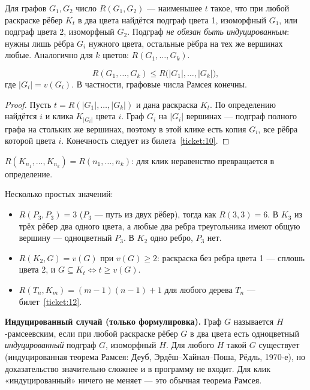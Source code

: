 \begin{definition}
Для графов \(G_1,G_2\) число \(R(G_1,G_2)\) — наименьшее \(t\) такое, что при любой
раскраске рёбер \(K_t\) в два цвета найдётся подграф цвета 1, изоморфный \(G_1\),
или подграф цвета 2, изоморфный \(G_2\). Подграф \emph{не обязан быть индуцированным}:
нужны лишь рёбра \(G_i\) нужного цвета, остальные рёбра на тех же вершинах любые.
Аналогично для \(k\) цветов: \(R(G_1,\ldots,G_k)\).
\end{definition}
\begin{theorem}[Существование]
\[
R(G_1,\ldots,G_k)\le R\bigl(|G_1|,\ldots,|G_k|\bigr),
\]
где \(|G_i|=v(G_i)\). В частности, графовые числа Рамсея конечны.
\end{theorem}
\begin{proof}
Пусть \(t=R(|G_1|,\ldots,|G_k|)\) и дана раскраска \(K_t\). По определению найдётся \(i\) и
клика \(K_{|G_i|}\) цвета \(i\). Граф \(G_i\) на \(|G_i|\) вершинах — подграф полного графа
на стольких же вершинах, поэтому в этой клике есть копия \(G_i\), все рёбра которой
цвета \(i\). Конечность следует из билета~\ref{ticket:10}.
\end{proof}
\begin{cor}
\(R(K_{n_1},\ldots,K_{n_k})=R(n_1,\ldots,n_k)\): для клик неравенство превращается в
определение.
\end{cor}

\begin{example}
Несколько простых значений:
\begin{itemize}\tightlist
\item \(R(P_3,P_3)=3\) (\(P_3\) — путь из двух рёбер), тогда как \(R(3,3)=6\).
  В \(K_3\) из трёх рёбер два одного цвета, а любые два ребра треугольника
  имеют общую вершину — одноцветный \(P_3\). В \(K_2\) одно ребро, \(P_3\) нет.
\item \(R(K_2,G)=v(G)\) при \(v(G)\ge2\): раскраска без ребра цвета 1 — сплошь цвета 2, и
  \(G\subseteq K_t\iff t\ge v(G)\).
\item \(R(T_n,K_m)=(m-1)(n-1)+1\) для любого дерева \(T_n\) — билет~\ref{ticket:12}.
\end{itemize}
\end{example}
\begin{tcolorbox}[colback=cbOrangeBack,colframe=cbOrange!45!cbGray,
  borderline west={1.6pt}{0pt}{cbOrange}]
\textbf{Индуцированный случай (только формулировка).} Граф \(G\) называется
\(H\)-рамсеевским, если при любой раскраске рёбер \(G\) в два цвета есть одноцветный
\emph{индуцированный} подграф \(G\), изоморфный \(H\). Для любого \(H\) такой \(G\)
существует (индуцированная теорема Рамсея: Деуб, Эрдёш–Хайнал–Поша, Рёдль, 1970-е),
но доказательство значительно сложнее и в программу не входит. Для клик
«индуцированный» ничего не меняет — это обычная теорема Рамсея.
\end{tcolorbox}
